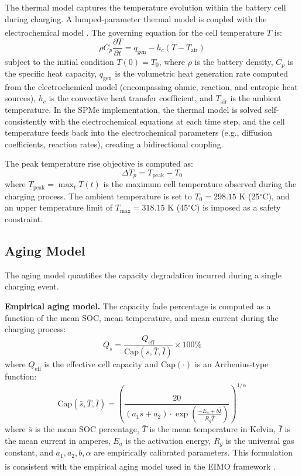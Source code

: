\documentclass[lettersize,journal]{IEEEtran}
\let\OLDcite\cite
\renewcommand{\cite}[1]{\textsuperscript{\OLDcite{#1}}}
\begin{document}
The thermal model captures the temperature evolution within the battery cell during charging. A lumped-parameter thermal model is coupled with the electrochemical model \cite{ref25}. The governing equation for the cell temperature $T$ is:
\begin{equation}
\label{eq:thermal}
\rho C_p \frac{\partial T}{\partial t} = q_{\text{gen}} - h_c (T - T_{\text{air}})
\end{equation}
subject to the initial condition $T(0) = T_0$, where $\rho$ is the battery density, $C_p$ is the specific heat capacity, $q_{\text{gen}}$ is the volumetric heat generation rate computed from the electrochemical model (encompassing ohmic, reaction, and entropic heat sources), $h_c$ is the convective heat transfer coefficient, and $T_{\text{air}}$ is the ambient temperature. In the SPMe implementation, the thermal model is solved self-consistently with the electrochemical equations at each time step, and the cell temperature feeds back into the electrochemical parameters (e.g., diffusion coefficients, reaction rates), creating a bidirectional coupling.

The peak temperature rise objective is computed as:
\begin{equation}
\label{eq:deltaT}
\Delta T_p = T_{\text{peak}} - T_0
\end{equation}
where $T_{\text{peak}} = \max_t T(t)$ is the maximum cell temperature observed during the charging process. The ambient temperature is set to $T_0 = 298.15$ K (25$^\circ$C), and an upper temperature limit of $T_{\max} = 318.15$ K (45$^\circ$C) is imposed as a safety constraint.

\subsection{Aging Model}

The aging model quantifies the capacity degradation incurred during a single charging event.

\textbf{Empirical aging model.} The capacity fade percentage is computed as a function of the mean SOC, mean temperature, and mean current during the charging process:
\begin{equation}
\label{eq:aging_emp}
Q_s = \frac{Q_{\text{eff}}}{\text{Cap}(\bar{s}, \bar{T}, \bar{I})} \times 100\%
\end{equation}
where $Q_{\text{eff}}$ is the effective cell capacity and $\text{Cap}(\cdot)$ is an Arrhenius-type function:
\begin{equation}
\label{eq:cap}
\text{Cap}(\bar{s}, \bar{T}, \bar{I}) = \left(\frac{20}{(a_1 \bar{s} + a_2) \cdot \exp\!\left(\frac{-E_a + b \bar{I}}{R_g \bar{T}}\right)}\right)^{1/\alpha}
\end{equation}
where $\bar{s}$ is the mean SOC percentage, $\bar{T}$ is the mean temperature in Kelvin, $\bar{I}$ is the mean current in amperes, $E_a$ is the activation energy, $R_g$ is the universal gas constant, and $a_1, a_2, b, \alpha$ are empirically calibrated parameters. This formulation is consistent with the empirical aging model used in the EIMO framework \cite{ref_eimo}.
\end{document}
